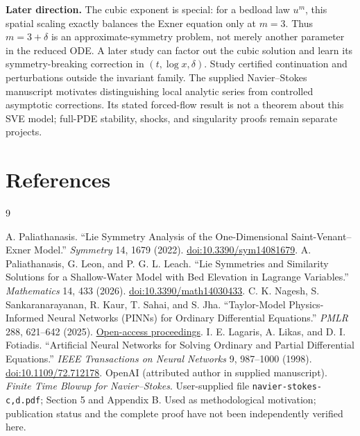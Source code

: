 \documentclass[12pt,a4paper]{article}
\begin{document}
\textbf{Later direction.} The cubic exponent is special: for a bedload law $u^m$, this spatial scaling exactly balances the Exner equation only at $m=3$. Thus $m=3+\delta$ is an approximate-symmetry problem, not merely another parameter in the reduced ODE. A later study can factor out the cubic solution and learn its symmetry-breaking correction in $(t,\log x,\delta)$. Study certified continuation and perturbations outside the invariant family. The supplied Navier--Stokes manuscript \cite{ns} motivates distinguishing local analytic series from controlled asymptotic corrections. Its stated forced-flow result is not a theorem about this SVE model; full-PDE stability, shocks, and singularity proofs remain separate projects.
\section*{References}
\begin{thebibliography}{9}
\raggedright
{} A. Paliathanasis. ``Lie Symmetry Analysis of the One-Dimensional Saint-Venant--Exner Model.'' \emph{Symmetry} 14, 1679 (2022). \href{https://doi.org/10.3390/sym14081679}{doi:10.3390/sym14081679}.
 A. Paliathanasis, G. Leon, and P. G. L. Leach. ``Lie Symmetries and Similarity Solutions for a Shallow-Water Model with Bed Elevation in Lagrange Variables.'' \emph{Mathematics} 14, 433 (2026). \href{https://doi.org/10.3390/math14030433}{doi:10.3390/math14030433}.
 C. K. Nagesh, S. Sankaranarayanan, R. Kaur, T. Sahai, and S. Jha. ``Taylor-Model Physics-Informed Neural Networks (PINNs) for Ordinary Differential Equations.'' \emph{PMLR} 288, 621--642 (2025). \href{https://proceedings.mlr.press/v288/nagesh25a.html}{Open-access proceedings}.
 I. E. Lagaris, A. Likas, and D. I. Fotiadis. ``Artificial Neural Networks for Solving Ordinary and Partial Differential Equations.'' \emph{IEEE Transactions on Neural Networks} 9, 987--1000 (1998). \href{https://doi.org/10.1109/72.712178}{doi:10.1109/72.712178}.
 OpenAI (attributed author in supplied manuscript). \emph{Finite Time Blowup for Navier--Stokes}. User-supplied file \texttt{navier-stokes-c,d.pdf}; Section 5 and Appendix B. Used as methodological motivation; publication status and the complete proof have not been independently verified here.
\end{thebibliography}
\end{document}
